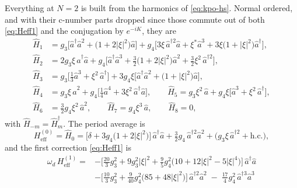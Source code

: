 \documentclass[a4paper,11pt]{article}
\newcommand{\eff}{\mathrm{eff}}
\begin{document}
\begin{example}
Everything at $N=2$ is built from the harmonics of \eqref{eq:kpo-hs}. Normal ordered, and with their c-number parts dropped since those commute out of both \eqref{eq:Heff1} and the conjugation by $e^{-iK}$, they are
\begin{equation}\label{eq:kpo-harmonics}
  \begin{aligned}
    \hat H_1 &= g_3\big[\hat a^\dagger\hat a^2 + \big(1+2\lvert\xi\rvert^2\big)\hat a\big]
      + g_4\big[3\xi\,\hat a^{\dagger2}\hat a + \xi^*\hat a^3
      + 3\xi\big(1+\lvert\xi\rvert^2\big)\hat a^\dagger\big],\\
    \hat H_2 &= 2g_3\xi\,\hat a^\dagger\hat a
      + g_4\big[\hat a^\dagger\hat a^3 + \tfrac32\big(1+2\lvert\xi\rvert^2\big)\hat a^2
      + \tfrac32\xi^2\,\hat a^{\dagger2}\big],\\
    \hat H_3 &= g_3\big[\tfrac13\hat a^3 + \xi^2\,\hat a^\dagger\big]
      + 3g_4\xi\big[\hat a^\dagger\hat a^2 + \big(1+\lvert\xi\rvert^2\big)\hat a\big],\\
    \hat H_4 &= g_3\xi\,\hat a^2 + g_4\big[\tfrac14\hat a^4 + 3\xi^2\,\hat a^\dagger\hat a\big],
    \qquad
    \hat H_5 = g_3\xi^2\,\hat a + g_4\xi\big[\hat a^3 + \xi^2\,\hat a^\dagger\big],\\
    \hat H_6 &= \tfrac32 g_4\xi^2\,\hat a^2,
    \qquad
    \hat H_7 = g_4\xi^3\,\hat a,
    \qquad
    \hat H_8 = 0 ,
  \end{aligned}
\end{equation}
with $\hat H_{-m} = \hat H_m^\dagger$. The period average is
\begin{equation}\label{eq:kpo-heff0}
  H_\eff^{(0)} = \hat H_0
  = \big[\delta + 3g_4\big(1+2\lvert\xi\rvert^2\big)\big]\,\hat a^\dagger\hat a
  + \tfrac{3}{2}g_4\,\hat a^{\dagger2}\hat a^2
  + \big(g_3\xi\,\hat a^{\dagger2} + \mathrm{h.c.}\big),
\end{equation}
and the first correction \eqref{eq:Heff1} is
\begin{equation}\label{eq:kpo-heff1}
  \begin{aligned}
  \omega_d\,H_\eff^{(1)} = {}
  &-\Big[\tfrac{20}{3}g_3^2 + 9g_3^2\lvert\xi\rvert^2
    + \tfrac{9}{5}g_4^2\big(10+12\lvert\xi\rvert^2-5\lvert\xi\rvert^4\big)\Big]\,\hat a^\dagger\hat a\\
  &-\Big[\tfrac{10}{3}g_3^2 + \tfrac{9}{40}g_4^2\big(85+48\lvert\xi\rvert^2\big)\Big]\,\hat a^{\dagger2}\hat a^2
   \;-\; \tfrac{17}{4}g_4^2\,\hat a^{\dagger3}\hat a^3\\

\end{aligned}
\end{equation}
\end{example}
\end{document}
